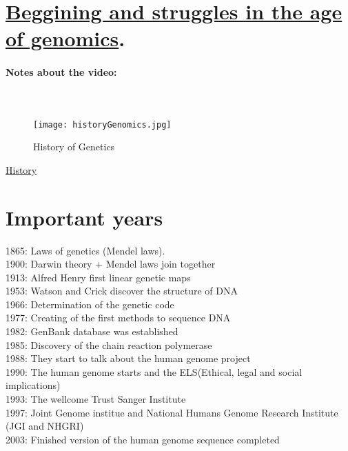 
\section{\href{https://www.youtube.com/watch?v=hS47TcdiKUU}{Beggining and struggles in the age of genomics}.}

\paragraph{Notes about the video:}

\paragraph{\\}
\begin{figure}[htbp]
    \centerline{\texttt{[image: historyGenomics.jpg]}}
    \caption{History of Genetics}
    \label{fig4}
\end{figure}

\href{https://www.genome.gov/human-genome-project/Timeline-of-Events}{History}

\section{Important years}
1865: Laws of genetics (Mendel laws). \\
1900: Darwin theory + Mendel laws join together \\
1913: Alfred Henry first linear genetic maps \\
1953: Watson and Crick discover the structure of DNA \\
1966: Determination of the genetic code \\
1977: Creating of the first methods to sequence DNA \\
1982: GenBank database was established \\ 
1985: Discovery of the chain reaction polymerase \\
1988: They start to talk about the human genome project \\
1990: The human genome starts and the ELS(Ethical, legal and social implications) \\
1993: The wellcome Trust Sanger Institute \\
1997: Joint Genome institue and National Humans Genome Research Institute (JGI and NHGRI)\\
2003: Finished version of the human genome sequence completed \\

